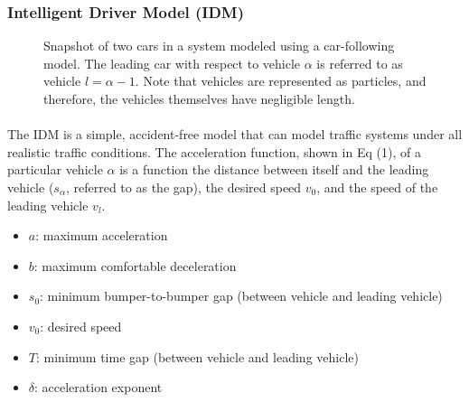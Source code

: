 \documentclass[12pt]{article}
\begin{document}
\subsubsection{Intelligent Driver Model (IDM)}
\begin{figure}
  \centering
  \caption{Snapshot of two cars in a system modeled using a car-following model.  The leading car with respect to vehicle $\alpha$ is referred to as vehicle $l=\alpha-1$.  Note that vehicles are represented as particles, and therefore, the vehicles themselves have negligible length.}
\end{figure}
\paragraph{}
The IDM is a simple, accident-free model that can model traffic systems under all realistic traffic conditions. The acceleration function, shown in Eq (1), of a particular vehicle $\alpha$ is a function the distance between itself and the leading vehicle ($s_\alpha$, referred to as the gap), the desired speed $v_0$, and the speed of the leading vehicle $v_l$.  

\begin{mymathbox}[title=IDM Parameters, colframe=blue!30!black]
  \begin{itemize}
    \item $a$: maximum acceleration
    \item $b$: maximum comfortable deceleration
    \item $s_0$: minimum bumper-to-bumper gap (between vehicle and leading vehicle)
    \item $v_0$: desired speed
    \item $T$: minimum time gap (between vehicle and leading vehicle)
    \item $\delta$: acceleration exponent
  \end{itemize}
\end{mymathbox}
\end{document}
